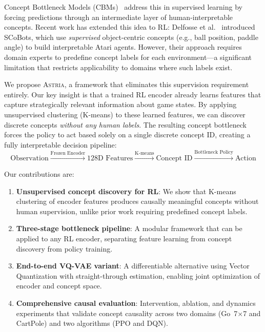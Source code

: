 \documentclass[11pt,a4paper]{article}
\newcommand{\astria}{\textsc{Astria}}
\begin{document}
Concept Bottleneck Models (CBMs)~\citep{koh2020concept} address this in supervised learning by forcing predictions through an intermediate layer of human-interpretable concepts. Recent work has extended this idea to RL: Delfosse et al.~\citep{delfosse2024interpretable} introduced SCoBots, which use \emph{supervised} object-centric concepts (e.g., ball position, paddle angle) to build interpretable Atari agents. However, their approach requires domain experts to predefine concept labels for each environment---a significant limitation that restricts applicability to domains where such labels exist.

We propose \astria{}, a framework that eliminates this supervision requirement entirely. Our key insight is that a trained RL encoder already learns features that capture strategically relevant information about game states. By applying unsupervised clustering (K-means) to these learned features, we can discover discrete concepts \emph{without any human labels}. The resulting concept bottleneck forces the policy to act based solely on a single discrete concept ID, creating a fully interpretable decision pipeline:
\[
\text{Observation} \xrightarrow{\text{Frozen Encoder}} \text{128D Features} \xrightarrow{\text{K-means}} \text{Concept ID} \xrightarrow{\text{Bottleneck Policy}} \text{Action}
\]

Our contributions are:
\begin{enumerate}[leftmargin=*]
    \item \textbf{Unsupervised concept discovery for RL}: We show that K-means clustering of encoder features produces causally meaningful concepts without human supervision, unlike prior work requiring predefined concept labels.
    \item \textbf{Three-stage bottleneck pipeline}: A modular framework that can be applied to any RL encoder, separating feature learning from concept discovery from policy training.
    \item \textbf{End-to-end VQ-VAE variant}: A differentiable alternative using Vector Quantization with straight-through estimation, enabling joint optimization of encoder and concept space.
    \item \textbf{Comprehensive causal evaluation}: Intervention, ablation, and dynamics experiments that validate concept causality across two domains (Go~7$\times$7 and CartPole) and two algorithms (PPO and DQN).
\end{enumerate}

\end{document}
